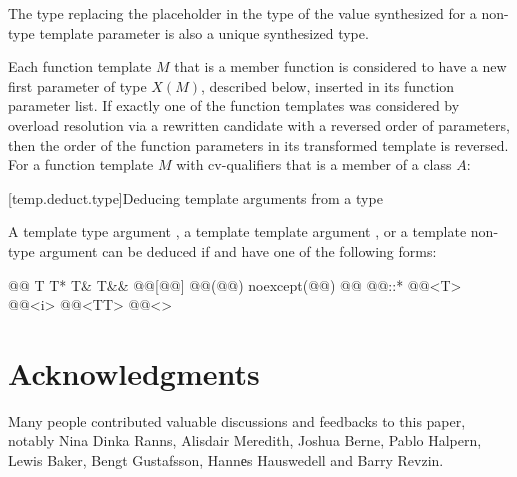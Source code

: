 \documentclass{wg21}
\begin{document}
\begin{note}
    The type replacing the placeholder
    in the type of the value synthesized for a non-type template parameter
    is also a unique synthesized type.
\end{note}
Each function template $M$ that is a member function
is considered to have
a new first parameter of type $X(M)$, described below,
inserted in its function parameter list.
If exactly one of the function templates was considered by overload resolution
via a rewritten candidate
with a reversed order of parameters,
then the order of the function parameters in its transformed template
is reversed.
For a function template $M$ with cv-qualifiers \cv{}
that is a member of a class $A$:


[temp.deduct.type]{Deducing template arguments from a type}


\pnum
A template type argument
,
a template template argument 
,
or a template non-type argument
can be deduced if
and
have one of the following forms:
\begin{codeblock}
    @\opt{\cv{}}@ T
    T*
    T&
    T&&
    @@[@@]
    @@(@@) noexcept(@@)
    @@ @@::*
    @@<T>
    @@<i>
    @@<TT>
    @@<>
\end{codeblock}


\section{Acknowledgments}
Many people contributed valuable discussions and feedbacks to this paper, notably
Nina Dinka Ranns, Alisdair Meredith, Joshua Berne, Pablo Halpern, Lewis Baker, Bengt Gustafsson,
Hannеs Hauswedell and Barry Revzin.






\renewcommand{\section}[2]{}%

\begin{thebibliography}{9}


\end{thebibliography}
\end{document}

